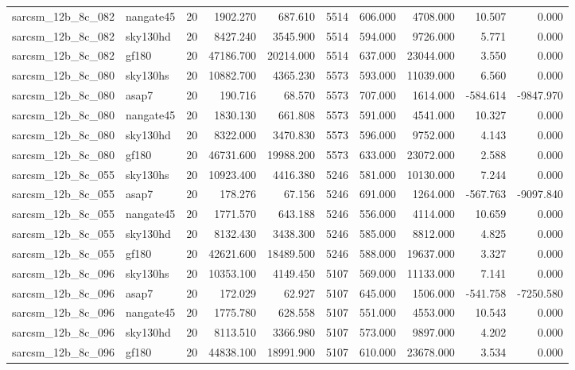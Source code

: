\begin{longtable}{llrrrrrrrr}
sarcsm\_12b\_8c\_082 & nangate45 & 20 & 1902.270 & 687.610 & 5514 & 606.000 & 4708.000 & 10.507 & 0.000 \\
sarcsm\_12b\_8c\_082 & sky130hd & 20 & 8427.240 & 3545.900 & 5514 & 594.000 & 9726.000 & 5.771 & 0.000 \\
sarcsm\_12b\_8c\_082 & gf180 & 20 & 47186.700 & 20214.000 & 5514 & 637.000 & 23044.000 & 3.550 & 0.000 \\
sarcsm\_12b\_8c\_080 & sky130hs & 20 & 10882.700 & 4365.230 & 5573 & 593.000 & 11039.000 & 6.560 & 0.000 \\
sarcsm\_12b\_8c\_080 & asap7 & 20 & 190.716 & 68.570 & 5573 & 707.000 & 1614.000 & -584.614 & -9847.970 \\
sarcsm\_12b\_8c\_080 & nangate45 & 20 & 1830.130 & 661.808 & 5573 & 591.000 & 4541.000 & 10.327 & 0.000 \\
sarcsm\_12b\_8c\_080 & sky130hd & 20 & 8322.000 & 3470.830 & 5573 & 596.000 & 9752.000 & 4.143 & 0.000 \\
sarcsm\_12b\_8c\_080 & gf180 & 20 & 46731.600 & 19988.200 & 5573 & 633.000 & 23072.000 & 2.588 & 0.000 \\
sarcsm\_12b\_8c\_055 & sky130hs & 20 & 10923.400 & 4416.380 & 5246 & 581.000 & 10130.000 & 7.244 & 0.000 \\
sarcsm\_12b\_8c\_055 & asap7 & 20 & 178.276 & 67.156 & 5246 & 691.000 & 1264.000 & -567.763 & -9097.840 \\
sarcsm\_12b\_8c\_055 & nangate45 & 20 & 1771.570 & 643.188 & 5246 & 556.000 & 4114.000 & 10.659 & 0.000 \\
sarcsm\_12b\_8c\_055 & sky130hd & 20 & 8132.430 & 3438.300 & 5246 & 585.000 & 8812.000 & 4.825 & 0.000 \\
sarcsm\_12b\_8c\_055 & gf180 & 20 & 42621.600 & 18489.500 & 5246 & 588.000 & 19637.000 & 3.327 & 0.000 \\
sarcsm\_12b\_8c\_096 & sky130hs & 20 & 10353.100 & 4149.450 & 5107 & 569.000 & 11133.000 & 7.141 & 0.000 \\
sarcsm\_12b\_8c\_096 & asap7 & 20 & 172.029 & 62.927 & 5107 & 645.000 & 1506.000 & -541.758 & -7250.580 \\
sarcsm\_12b\_8c\_096 & nangate45 & 20 & 1775.780 & 628.558 & 5107 & 551.000 & 4553.000 & 10.543 & 0.000 \\
sarcsm\_12b\_8c\_096 & sky130hd & 20 & 8113.510 & 3366.980 & 5107 & 573.000 & 9897.000 & 4.202 & 0.000 \\
sarcsm\_12b\_8c\_096 & gf180 & 20 & 44838.100 & 18991.900 & 5107 & 610.000 & 23678.000 & 3.534 & 0.000 \\

\end{longtable}
